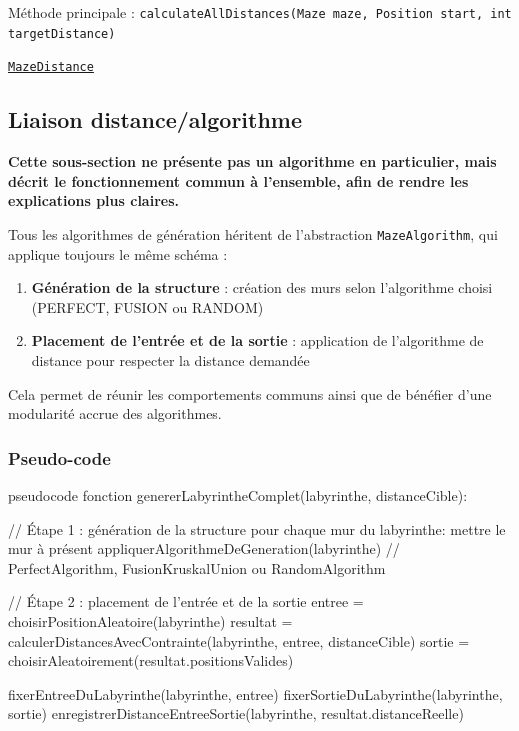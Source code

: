 \documentclass{butexFR}
\begin{document}
Méthode principale : \texttt{calculateAllDistances(Maze maze, Position start, int targetDistance)}

\href{https://gitlab.univ-lille.fr/sae302/2025/G2_SAE3.3/-/blob/master/labyrinth/src/main/java/fr/univlille/labyrinth/model/algorithm/pathsearch/MazeDistance.java?ref_type=heads}{\texttt{MazeDistance}}

\newpage 

\subsection{Liaison distance/algorithme}

\textbf{Cette sous-section ne présente pas un algorithme en particulier, mais décrit le fonctionnement commun à l’ensemble, afin de rendre les explications plus claires.}

Tous les algorithmes de génération héritent de l'abstraction \texttt{MazeAlgorithm}, qui applique toujours le même schéma :

\begin{enumerate}
    \item \textbf{Génération de la structure} : création des murs selon l’algorithme choisi (PERFECT, FUSION ou RANDOM)
    \item \textbf{Placement de l’entrée et de la sortie} : application de l’algorithme de distance pour respecter la distance demandée
\end{enumerate}

Cela permet de réunir les comportements communs ainsi que de bénéfier d'une modularité accrue des algorithmes.

\subsubsection{Pseudo-code}

\begin{codeboxlang}{pseudocode}
fonction genererLabyrintheComplet(labyrinthe, distanceCible):

    // Étape 1 : génération de la structure
    pour chaque mur du labyrinthe:
        mettre le mur à présent
    appliquerAlgorithmeDeGeneration(labyrinthe)
        // PerfectAlgorithm, FusionKruskalUnion ou RandomAlgorithm

    // Étape 2 : placement de l'entrée et de la sortie
    entree = choisirPositionAleatoire(labyrinthe)
    resultat = calculerDistancesAvecContrainte(labyrinthe, entree, distanceCible)
    sortie = choisirAleatoirement(resultat.positionsValides)

    fixerEntreeDuLabyrinthe(labyrinthe, entree)
    fixerSortieDuLabyrinthe(labyrinthe, sortie)
    enregistrerDistanceEntreeSortie(labyrinthe, resultat.distanceReelle)
\end{codeboxlang}
\end{document}

